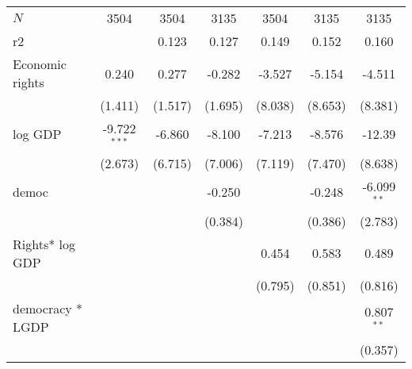 \documentclass[10pt,letterpaper,subeqn]{beamer}
\begin{document}
\begin{frame}[label=placebo1]
\begin{table}[htbp]
\begin{tabular}{l*{6}{c}}
\hline
\(N\)       &        3504         &        3504         &        3135         &        3504         &        3135         &        3135         \\
r2          &                     &       0.123         &       0.127         &       0.149         &       0.152         &       0.160         \\
\hline\hline
Economic rights       &       0.240         &       0.277         &      -0.282         &      -3.527         &      -5.154         &      -4.511         \\
            &     (1.411)         &     (1.517)         &     (1.695)         &     (8.038)         &     (8.653)         &     (8.381)         \\

log GDP        &      -9.722$^{***}$&      -6.860         &      -8.100         &      -7.213         &      -8.576         &      -12.39         \\
            &     (2.673)         &     (6.715)         &     (7.006)         &     (7.119)         &     (7.470)         &     (8.638)         \\

democ       &                     &                     &      -0.250         &                     &      -0.248         &      -6.099$^{**}$ \\
            &                     &                     &     (0.384)         &                     &     (0.386)         &     (2.783)         \\

Rights* log GDP   &                     &                     &                     &       0.454         &       0.583         &       0.489         \\
            &                     &                     &                     &     (0.795)         &     (0.851)         &     (0.816)         \\

democracy * LGDP   &                     &                     &                     &                     &                     &       0.807$^{**}$ \\
            &                     &                     &                     &                     &                     &     (0.357)         \\


\end{tabular}
\end{table}
\end{frame}
\end{document}
